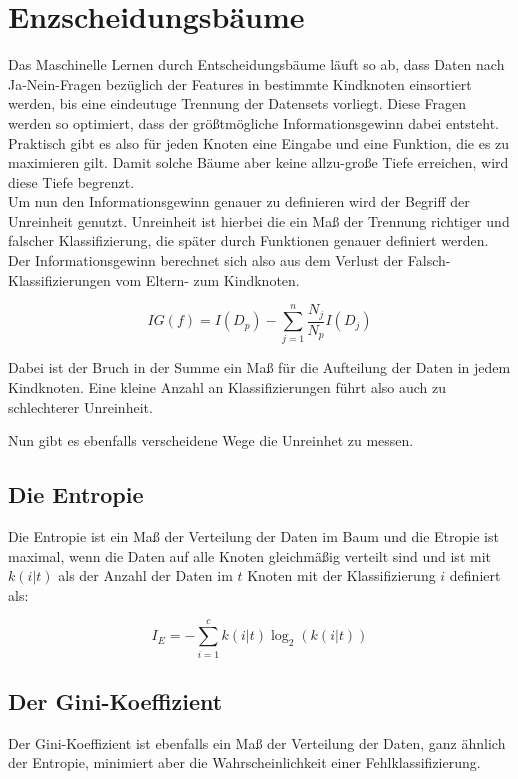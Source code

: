 \documentclass[11pt]{article} %
\begin{document}
\section{Enzscheidungsbäume}

Das Maschinelle Lernen durch Entscheidungsbäume läuft so ab, dass Daten nach Ja-Nein-Fragen bezüglich der Features in bestimmte
Kindknoten einsortiert werden, bis eine eindeutuge Trennung der Datensets vorliegt. Diese Fragen werden so optimiert, dass der größtmögliche 
Informationsgewinn dabei entsteht. Praktisch gibt es also für jeden Knoten eine Eingabe und eine Funktion, die es zu maximieren gilt. Damit solche Bäume aber keine allzu-große Tiefe erreichen, wird diese Tiefe begrenzt.\\
Um nun den Informationsgewinn genauer zu definieren wird der Begriff der Unreinheit genutzt. Unreinheit ist hierbei die ein Maß der Trennung richtiger und falscher Klassifizierung, die später durch Funktionen genauer definiert werden. Der Informationsgewinn berechnet sich also aus dem
Verlust der Falsch-Klassifizierungen vom Eltern- zum Kindknoten.

\begin{equation}
IG(f) = I(D_p) - \sum_{j = 1}^{n}  \frac{N_j}{N_p} I(D_j)
\end{equation}

Dabei ist der Bruch in der Summe ein Maß für die Aufteilung der Daten in jedem Kindknoten. Eine kleine Anzahl an Klassifizierungen führt also auch zu schlechterer Unreinheit.

Nun gibt es ebenfalls verscheidene Wege die Unreinhet zu messen.

\subsection{Die Entropie}

Die Entropie ist ein Maß der Verteilung der Daten im Baum und die Etropie ist maximal, wenn die Daten auf alle Knoten gleichmäßig verteilt sind und ist mit $k(i|t)$ als der Anzahl der Daten im $t$ Knoten mit der Klassifizierung $i$ definiert als:

\begin{equation}
I_{E} = - \sum_{i = 1}^c k(i|t) \log_2(k(i|t))
\end{equation}

\subsection{Der Gini-Koeffizient}
Der Gini-Koeffizient ist ebenfalls ein Maß der Verteilung der Daten, ganz ähnlich der Entropie, minimiert aber die Wahrscheinlichkeit einer Fehlklassifizierung.
\end{document}
